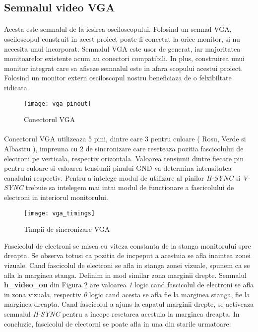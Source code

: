 \subsection{Semnalul video VGA}
\paragraph{}
Acesta este semnalul de la iesirea osciloscopului. Folosind un semnal VGA, osciloscopul construit in acest proiect poate fi conectat la orice monitor, si nu necesita unul incorporat. Semnalul VGA este usor de generat, iar majoritatea monitoarelor existente acum au conectori compatibili. In plus, construirea unui monitor integrat care sa afiseze semnalul este in afara scopului acestui proiect. Folosind un monitor extern osciloscopul nostru beneficiaza de o felxibiltate ridicata.

\begin{figure}[h]
\centering
\texttt{[image: vga\_pinout]}
\caption{Conectorul VGA}
\label{fig:vga_pinout}
\end{figure}

\paragraph{}
Conectorul VGA utilizeaza 5 pini, dintre care 3 pentru culoare ( Rosu, Verde si Albastru ), impreuna cu 2 de sincronizare care reseteaza pozitia fascicolului de electroni pe verticala, respectiv orizontala. Valoarea tensiunii dintre fiecare pin pentru culoare si valoarea tensiunii pinului GND va determina intensitatea canalului respectiv. Pentru a intelege modul de utilizare al pinilor \emph{H-SYNC} si \emph{V-SYNC} trebuie sa intelegem mai intai modul de functionare a fascicolului de electroni in interiorul monitorului.

\begin{figure}[h]
\centering
\texttt{[image: vga\_timings]}
\caption{Timpii de sincronizare VGA}
\label{fig:vga_timings}
\end{figure}

Fascicolul de electroni se misca cu viteza constanta de la stanga monitorului spre dreapta. Se observa totusi ca pozitia de incpeput a acestuia se afla inaintea zonei vizuale. Cand fascicolul de electroni se afla in stanga zonei vizuale, spunem ca se afla la marginea stanga. Definim in mod similar zona marginii drepte. Semnalul {\bf h\_video\_on } din Figura \ref{fig:vga_timings} are valoarea \emph{1} logic cand fascicolul de electroni se afla in zona vizuala, respectiv \emph{0} logic cand acesta se afla fie la marginea stanga, fie la marginea dreapta. Cand fascicolul a ajuns la capatul marginii drepte, se activeaza semnalul \emph{H-SYNC} pentru a incepe resetarea acestuia la marginea dreapta. In concluzie, fascicolul de electorni se poate afla in una din starile urmatoare:

